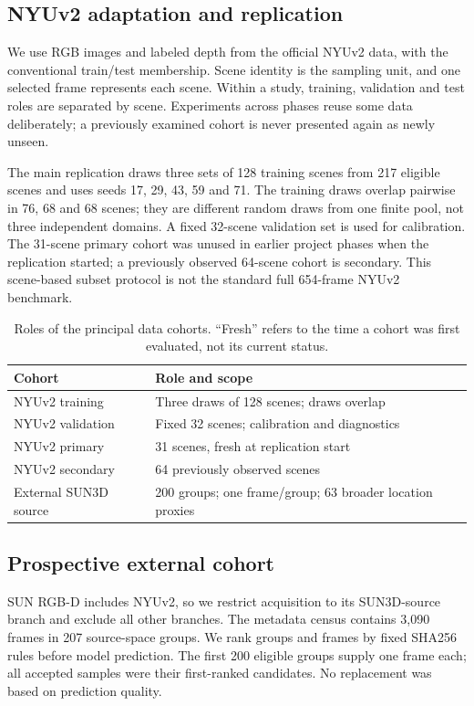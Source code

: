 \documentclass[10pt,twocolumn,letterpaper]{article}
\begin{document}
\subsection{NYUv2 adaptation and replication}
We use RGB images and labeled depth from the official NYUv2 data, with the conventional train/test membership. Scene identity is the sampling unit, and one selected frame represents each scene. Within a study, training, validation and test roles are separated by scene. Experiments across phases reuse some data deliberately; a previously examined cohort is never presented again as newly unseen.

The main replication draws three sets of 128 training scenes from 217 eligible scenes and uses seeds 17, 29, 43, 59 and 71. The training draws overlap pairwise in 76, 68 and 68 scenes; they are different random draws from one finite pool, not three independent domains. A fixed 32-scene validation set is used for calibration. The 31-scene primary cohort was unused in earlier project phases when the replication started; a previously observed 64-scene cohort is secondary. This scene-based subset protocol is not the standard full 654-frame NYUv2 benchmark.

\begin{table}[t]
\centering\small
\caption{Roles of the principal data cohorts. ``Fresh'' refers to the time a cohort was first evaluated, not its current status.}
\label{tab:data}
\begin{tabular}{p{}p{}}\toprule
Cohort & Role and scope\\\midrule
NYUv2 training & Three draws of 128 scenes; draws overlap\\
NYUv2 validation & Fixed 32 scenes; calibration and diagnostics\\
NYUv2 primary & 31 scenes, fresh at replication start\\
NYUv2 secondary & 64 previously observed scenes\\
External SUN3D source & 200 groups; one frame/group; 63 broader location proxies\\\bottomrule
\end{tabular}
\end{table}

\subsection{Prospective external cohort}
SUN RGB-D includes NYUv2, so we restrict acquisition to its SUN3D-source branch and exclude all other branches. The metadata census contains 3,090 frames in 207 source-space groups. We rank groups and frames by fixed SHA256 rules before model prediction. The first 200 eligible groups supply one frame each; all accepted samples were their first-ranked candidates. No replacement was based on prediction quality.
\end{document}
